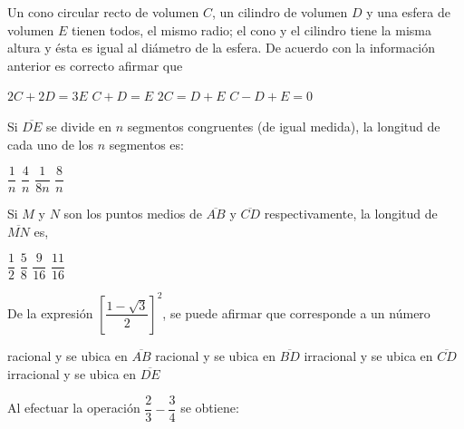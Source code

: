 \documentclass[10pt,letterpaper,addpoints]{exam}
\begin{document}
\begin{multicols}{2}
\begin{questions}
\begin{center}
   \end{center}
\question Un cono circular recto de volumen $C$, un cilindro de volumen $D$ y una esfera de volumen $E$ tienen todos, el mismo radio; el cono y el cilindro tiene la misma altura y ésta es igual al diámetro de la esfera. De acuerdo con la información anterior es correcto afirmar que
\begin{choices}
  \choice $ 2C+2D=3E $
  \choice $ C+D=E $
  \choice $ 2C=D+E $
  \CorrectChoice $ C-D+E=0 $
\end{choices}
 \begin{center}
\end{center}
\question \label{firstq}Si $\overline{DE}$ se divide en $n$ segmentos congruentes (de igual medida), la longitud de cada uno de los $n$ segmentos es:
\begin{choices}
\begin{multicols}{2}
\choice $\dfrac{1}{n}$
\choice $\dfrac{4}{n}$
\CorrectChoice $\dfrac{1}{8n}$
\choice $\dfrac{8}{n}$
\end{multicols}
\end{choices}
\question Si $M$ y $N$ son los puntos medios de $\overline{AB}$ y $\overline{CD}$ respectivamente, la longitud de $\overline{MN}$ es,
\begin{choices}
 \choice $\dfrac{1}{2}$
 \choice $\dfrac{5}{8}$
 \choice $\dfrac{9}{16}$
 \CorrectChoice $\dfrac{11}{16}$
\end{choices}
\question \label{lastq} De la expresión $\left[\dfrac{1-\sqrt{3}}{2}\right]^{2}$, se puede afirmar que corresponde a un número
\begin{choices}
 \choice racional y se ubica en $\overline{AB}$
 \choice racional y se ubica en $\overline{BD}$
 \choice irracional y se ubica en $\overline{CD}$
 \CorrectChoice irracional y se ubica en $\overline{DE}$
\end{choices}
\question Al efectuar la operación $\dfrac{2}{3}-\dfrac{3}{4}$ se obtiene:


\end{questions}
\end{multicols}
\end{document}
